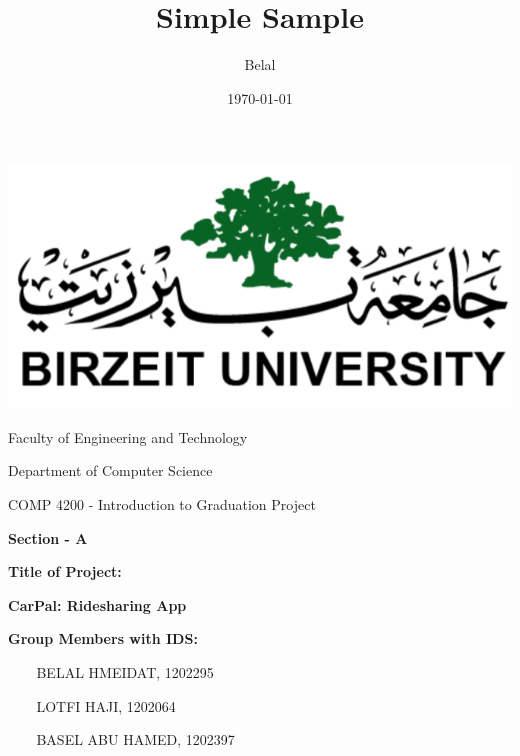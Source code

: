 \documentclass[a4paper, 12pt]{article} %
\title{Simple Sample} %
\author{Belal} %
\date{\today} %
\begin{document}
 
    \begin{titlepage}
        \begin{center}
            \includegraphics{Birzeit_Logo.png}

            \Large{Faculty of Engineering and Technology}
            \vspace{0.8cm}

            Department of Computer Science 
            \vspace{0.8cm}

            COMP 4200 - Introduction to Graduation Project
            \vspace{0.8cm}

            \textbf{\large{Section - A}}
            \vspace{0.8cm}
            
            \end{center}
            
            \textbf{\large{Title of Project:}}
            \vspace{0.4cm}
            
            \begin{center}
                \textbf{\Large{CarPal: Ridesharing App}}
            \end{center} 
            \vspace{0.8cm}
            
            \textbf{\large{Group Members with IDS:}}
            
            \hrulefill
            \begin{itemize}
                \item[$ $] BELAL HMEIDAT, 1202295 %
                \item[$ $] LOTFI HAJI, 1202064
                \item[$ $] BASEL ABU HAMED, 1202397
            \end{itemize}
            


\end{titlepage}
\end{document}

